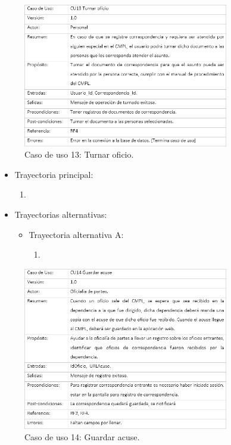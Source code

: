
\begin{figure}[htbp!]
		\centering
			\includegraphics[width=0.8\textwidth]{images/CU/CU13}
		\caption{Caso de uso 13: Turnar oficio.}
		\label{Tabla}
	\end{figure}
	
\begin{itemize}
	\item Trayectoria principal:
	\begin{enumerate}
		\item 
	\end{enumerate}
	
	\item Trayectorias alternativas:
	\begin{itemize}
		\item Trayectoria alternativa A:
			\begin{enumerate}
				\item 
			\end{enumerate}
	\end{itemize}
\end{itemize}


\begin{figure}[htbp!]
		\centering
			\includegraphics[width=0.8\textwidth]{images/CU/CU14}
		\caption{Caso de uso 14: Guardar acuse.}
		\label{Tabla}
	\end{figure}
	
